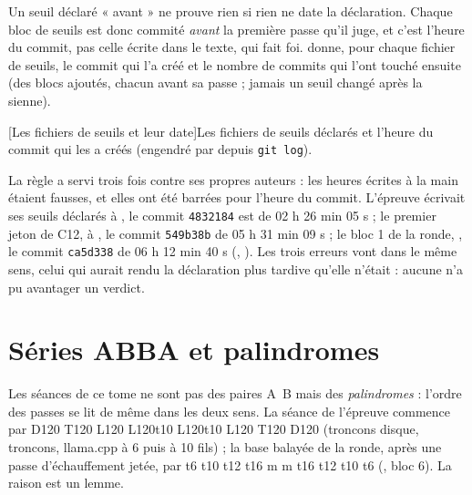 Un seuil déclaré « avant » ne prouve rien si rien ne date la déclaration. Chaque bloc de seuils est donc commité \emph{avant} la première passe qu'il juge, et c'est l'heure du commit, pas celle écrite dans le texte, qui fait foi.  donne, pour chaque fichier de seuils, le commit qui l'a créé et le nombre de commits qui l'ont touché ensuite (des blocs ajoutés, chacun avant sa passe ; jamais un seuil changé après la sienne).

\begingroup
{}[Les fichiers de seuils et leur date]{Les fichiers de seuils déclarés et l'heure du commit qui les a créés (engendré par  depuis \texttt{git log}).}\label{t2ann:tab:seuils}

\endgroup

La règle a servi trois fois contre ses propres auteurs : les heures écrites à la main étaient fausses, et elles ont été barrées pour l'heure du commit. L'épreuve écrivait ses seuils déclarés à , le commit \texttt{4832184} est de 02 h 26 min 05 s ; le premier jeton de C12, à , le commit \texttt{549b38b} de 05 h 31 min 09 s ; le bloc 1 de la ronde, , le commit \texttt{ca5d338} de 06 h 12 min 40 s (, ). Les trois erreurs vont dans le même sens, celui qui aurait rendu la déclaration plus tardive qu'elle n'était : aucune n'a pu avantager un verdict.

\section{Séries ABBA et palindromes}\label{t2ann:sec:palindromes}

Les séances de ce tome ne sont pas des paires A~B mais des \emph{palindromes} : l'ordre des passes se lit de même dans les deux sens. La séance de l'épreuve commence par D120 T120 L120 L120t10 L120t10 L120 T120 D120 (troncons disque, troncons, llama.cpp à 6 puis à 10 fils) ; la base balayée de la ronde, après une passe d'échauffement jetée, par t6 t10 t12 t16 m m t16 t12 t10 t6 (, bloc 6). La raison est un lemme.

